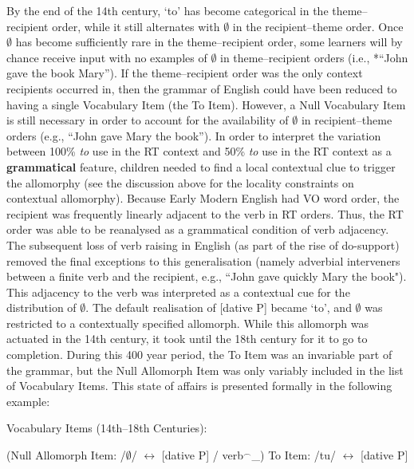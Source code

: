 	By the end of the 14th century, `to' has become categorical in the theme--recipient order, while it still alternates with $\emptyset$ in the recipient--theme order. Once $\emptyset$ has become sufficiently rare in the theme--recipient order, some learners will by chance receive input with no examples of $\emptyset$ in theme--recipient orders (i.e., *``John gave the book Mary''). If the theme--recipient order was the only context recipients occurred in, then the grammar of English could have been reduced to having a single Vocabulary Item (the To Item). However, a Null Vocabulary Item is still necessary in order to account for the availability of $\emptyset$ in recipient--theme orders (e.g., ``John gave Mary the book''). In order to interpret the variation between 100\% \textit{to} use in the RT context and 50\% \textit{to} use in the RT context as a \textbf{grammatical} feature, children needed to find a local contextual clue to trigger the allomorphy (see the discussion above for the locality constraints on contextual allomorphy). Because Early Modern English had VO word order, the recipient was frequently linearly adjacent to the verb in RT orders. Thus, the RT order was able to be reanalysed as a grammatical condition of verb adjacency. The subsequent loss of verb raising in English (as part of the rise of do-support) removed the final exceptions to this generalisation (namely adverbial interveners between a finite verb and the recipient, e.g., ``John gave quickly Mary the book"). This adjacency to the verb was interpreted as a contextual cue for the distribution of $\emptyset$. The default realisation of [dative P] became `to', and $\emptyset$ was restricted to a contextually specified allomorph. While this allomorph was actuated in the 14th century, it took until the 18th century for it to go to completion. During this 400 year period, the To Item was an invariable part of the grammar, but the Null Allomorph Item was only variably included in the list of Vocabulary Items. This state of affairs is presented formally in the following example:

	\begin{exe}
		\ex Vocabulary Items (14th--18th Centuries):
		\begin{xlist}
			\ex (Null Allomorph Item: /$\emptyset$/ $\leftrightarrow$ [dative P] / verb$^{\smallfrown}$\_)
			\ex To Item: /tu/ $\leftrightarrow$ [dative P]
		\end{xlist}
	\end{exe}

